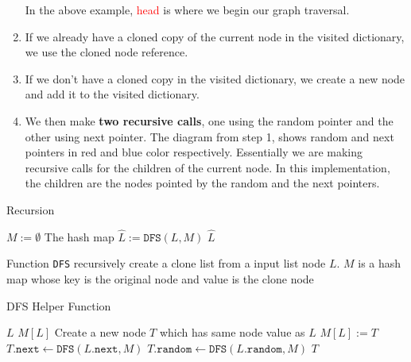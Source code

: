 \begin{enumerate}
\begin{figure}[H]
\end{figure}
    In the above example, \textcolor{red}{head} is where we begin our graph traversal.
    \item If we already have a cloned copy of the current node in the visited dictionary, we use the cloned node reference.
    \item If we don't have a cloned copy in the visited dictionary, we create a new node and add it to the visited dictionary.
    \item We then make \textbf{two recursive calls}, one using the random pointer and the other using next pointer. The diagram from step 1, shows random and next pointers in red and blue color respectively. Essentially we are making recursive calls for the children of the current node. In this implementation, the children are the nodes pointed by the random and the next pointers.
\end{enumerate}
\setcounter{algorithm}{0}
\begin{algorithm}[H]
\caption{Recursion}
\begin{algorithmic}[1]
\State $M:=\emptyset$ \Comment The hash map
\State $\hat{L}:=\texttt{DFS}(L, M)$
\State \Return $\hat{L}$
\EndProcedure
\end{algorithmic}
\end{algorithm}
Function \texttt{DFS} recursively create a clone list from a input list node $L$. $M$ is a hash map whose key is the original node and value is the clone node
\begin{algorithm}[H]
\caption{DFS Helper Function}
\begin{algorithmic}[1]
\State \Return $L$
\EndIf
{}
\State \Return $M[L]$
\EndIf
\State Create a new node $T$ which has same node value as $L$
\State $M[L]:=T$
\State $T.\texttt{next}\gets \texttt{DFS}(L.\texttt{next}, M)$
\State $T.\texttt{random}\gets \texttt{DFS}(L.\texttt{random}, M)$
\State \Return $T$
\EndFunction
\end{algorithmic}
\end{algorithm}
